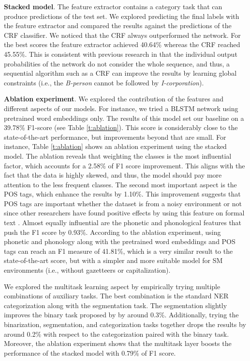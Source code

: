 \documentclass[11pt,a4paper]{article}
\begin{document}
\noindent \textbf{Stacked model}. The feature extractor contains a category task that can produce predictions of the test set. We explored predicting the final labels with the feature extractor and compared the results against the predictions of the CRF classifier. We noticed that the CRF always outperformed the network. For the best scores the feature extractor achieved 40.64\% whereas the CRF reached 45.55\%. This is consistent with previous research \citep{DBLP:journals/corr/LampleBSKD16,AguilarEtAl:17} in that the individual output probabilities of the network do not consider the whole sequence, and thus, a sequential algorithm such as a CRF can improve the results by learning global constraints (i.e., the \textit{B-person} cannot be followed by \textit{I-corporation}).

\noindent \textbf{Ablation experiment}. We explored the contribution of the features and different aspects of our models. For instance, we tried a BLSTM network using pretrained word embeddings only. The results of this model set our baseline on a 39.78\% F1-score (see Table \ref{t:ablation}). This score is considerably close to the state-of-the-art performance, but improvements beyond that are small. For instance, Table \ref{t:ablation} shows an ablation experiment using the stacked model. The ablation reveals that weighting the classes is the most influential factor, which accounts for a 2.58\% of F1 score improvement. This aligns with the fact that the data is highly skewed, and thus, the model should pay more attention to the less frequent classes. The second most important aspect is the POS tags, which enhance the results by 1.10\%. This improvement suggests that POS tags are important whether the dataset is from a noisy environment or not since other researchers have found positive effects by using this feature on formal text \citep{DBLP:journals/corr/HuangXY15}. Almost equally influential are the phonetic and phonological features that push the F1 score by 0.93\%. According to the ablation experiment, using phonetic and phonology along with the pretrained word embeddings and POS tags can reach an F1 measure of 41.81\%, which is a very similar result to the state-of-the-art score, but with a simpler and more suitable model for SM environments (i.e., without gazetteers or capitalization).

We explored the multitask learning aspect by empirically trying multiple combinations of auxiliary tasks. The best combination is the standard NER categorization along with the segmentation task. The segmentation slightly improves the binary task proposed by \citet{AguilarEtAl:17} by around 0.3\%. Additionally, trying the binarization, segmentation, and categorization tasks together drops the results by around 0.2\% with respect to the categorization paired with the binary task. Moreover, the ablation experiment shows that the multitask layer boosts the performance of the stacked model with 0.79\% of F1 score. 
\end{document}
